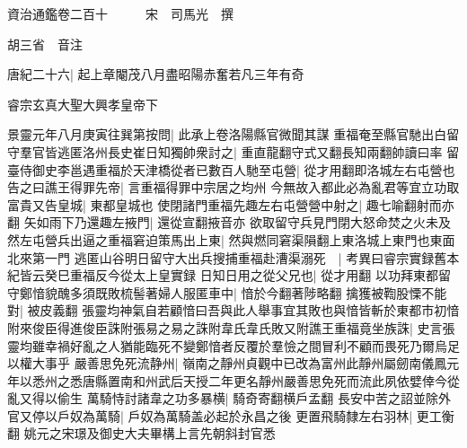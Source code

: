 資治通鑑卷二百十　　　宋　司馬光　撰

胡三省　音注

唐紀二十六|{
	起上章閹茂八月盡昭陽赤奮若凡三年有奇}


睿宗玄真大聖大興孝皇帝下

景靈元年八月庚寅往巽第按問|{
	此承上卷洛陽縣官微聞其謀}
重福奄至縣官馳出白留守羣官皆逃匿洛州長史崔日知獨帥衆討之|{
	重直龍翻守式又翻長知兩翻帥讀曰率}
留臺侍御史李邕遇重福於天津橋從者已數百人馳至屯營|{
	從才用翻即洛城左右屯營也}
告之曰譙王得罪先帝|{
	言重福得罪中宗居之均州}
今無故入都此必為亂君等宜立功取富貴又告皇城|{
	東都皇城也}
使閉諸門重福先趣左右屯營營中射之|{
	趣七喻翻射而亦翻}
矢如雨下乃還趣左掖門|{
	還從宣翻掖音亦}
欲取留守兵見門閉大怒命焚之火未及然左屯營兵出逼之重福窘迫策馬出上東|{
	然與燃同窘渠隕翻上東洛城上東門也東面北來第一門}
逃匿山谷明日留守大出兵搜捕重福赴漕渠溺死　|{
	考異曰睿宗實録舊本紀皆云癸巳重福反今從太上皇實録}
日知日用之從父兄也|{
	從才用翻}
以功拜東都留守鄭愔貌醜多須既敗梳髻著婦人服匿車中|{
	愔於今翻著陟略翻}
擒獲被鞫股慄不能對|{
	被皮義翻}
張靈均神氣自若顧愔曰吾與此人舉事宜其敗也與愔皆斬於東都市初愔附來俊臣得進俊臣誅附張易之易之誅附韋氏韋氏敗又附譙王重福竟坐族誅|{
	史言張靈均雖幸禍好亂之人猶能臨死不變鄭愔者反覆於羣憸之間冒利不顧而畏死乃爾烏足以權大事乎}
嚴善思免死流静州|{
	嶺南之靜州貞觀中已改為富州此靜州屬劒南儀鳳元年以悉州之悉唐縣置南和州武后天授二年更名靜州嚴善思免死而流此夙依嬖倖今從亂又得以偷生}
萬騎恃討諸韋之功多暴横|{
	騎奇寄翻横戶孟翻}
長安中苦之詔並除外官又停以戶奴為萬騎|{
	戶奴為萬騎盖必起於永昌之後}
更置飛騎隸左右羽林|{
	更工衡翻}
姚元之宋璟及御史大夫畢構上言先朝斜封官悉

